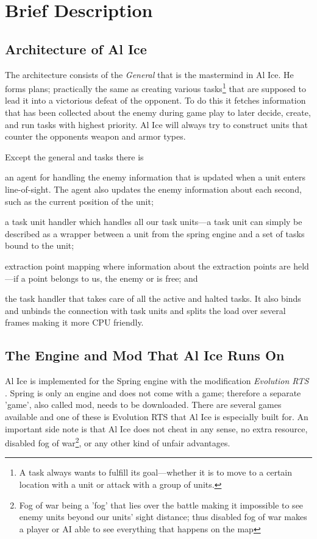 \chapter[Brief Description]{Brief Description}

\section{Architecture of Al Ice}
The architecture consists of the \emph{General} that is the mastermind in Al Ice. He
forms plans; practically the same as creating various tasks\footnote{A task always wants to fulfill
its goal---whether it is to move to a certain location with a unit or attack with a group of units.}
that are supposed to lead it into a victorious defeat of the opponent. To do this it fetches
information that has been collected about the enemy during game play to later decide, create, and run tasks with highest
priority. Al Ice will always try to construct units that counter the opponents weapon and armor
types.

Except the general and tasks there is
\begin{inparaenum}
\item an agent for handling the enemy information that is updated when a unit enters line-of-sight.
The agent also updates the enemy information about each second, such as the current position of the
unit; 
\item a task unit handler which handles all our task units---a task unit can simply be described as
a wrapper between a unit from the spring engine and a set of tasks bound to the unit;
\item extraction point mapping where information about the extraction points are held---if a point
belongs to us, the enemy or is free; and
\item the task handler that takes care of all the active and halted tasks. It also binds and unbinds
the connection with task units and splits the load over several frames making it more CPU friendly.
\end{inparaenum}

\section{The Engine and Mod That Al Ice Runs On}
Al Ice is implemented for the Spring
engine \cite{Spring} with the modification \emph{Evolution RTS}
\cite{EvolutionRTS}. Spring is only an engine and does not come with a game; therefore a separate 'game', also called mod, needs to be
downloaded. There are several games available and one of these is Evolution RTS that Al Ice is
especially built for. An important side note is that Al Ice does not cheat in any sense, no extra
resource, disabled fog of war\footnote{Fog of war being a 'fog' that lies over the battle making
it impossible to see enemy units beyond our units' sight distance; thus disabled fog of war makes
a player or AI able to see everything that happens on the map}, or any other kind of unfair
advantages.
